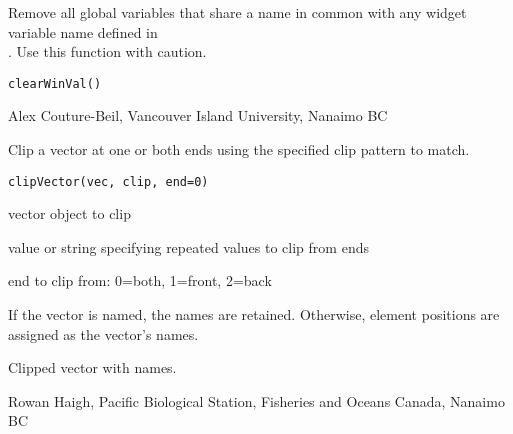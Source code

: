 \documentclass[letterpaper]{book}
\begin{document}
%
\begin{Description}\relax
Remove all global variables that share a name in common with any widget variable name 
defined in \\{} . Use this function with caution.
\end{Description}
%
\begin{Usage}
\begin{verbatim}
clearWinVal()
\end{verbatim}
\end{Usage}
%
\begin{Author}\relax
Alex Couture-Beil, Vancouver Island University, Nanaimo BC
\end{Author}
%
\begin{SeeAlso}\relax
{}
\end{SeeAlso}
%
\begin{Description}\relax
Clip a vector at one or both ends using the specified clip 
pattern to match.
\end{Description}
%
\begin{Usage}
\begin{verbatim}
clipVector(vec, clip, end=0)
\end{verbatim}
\end{Usage}
%
\begin{Arguments}
\begin{ldescription}
\item[\code{vec}] vector object to clip
\item[\code{clip}] value or string specifying repeated values to clip from ends
\item[\code{end}] end to clip  from: 0=both, 1=front, 2=back
\end{ldescription}
\end{Arguments}
%
\begin{Details}\relax
If the vector is named, the names are retained. Otherwise,
element positions are assigned as the vector's names.
\end{Details}
%
\begin{Value}
Clipped vector with names.
\end{Value}
%
\begin{Author}\relax
Rowan Haigh, Pacific Biological Station, Fisheries and Oceans Canada, Nanaimo BC
\end{Author}
\end{document}

